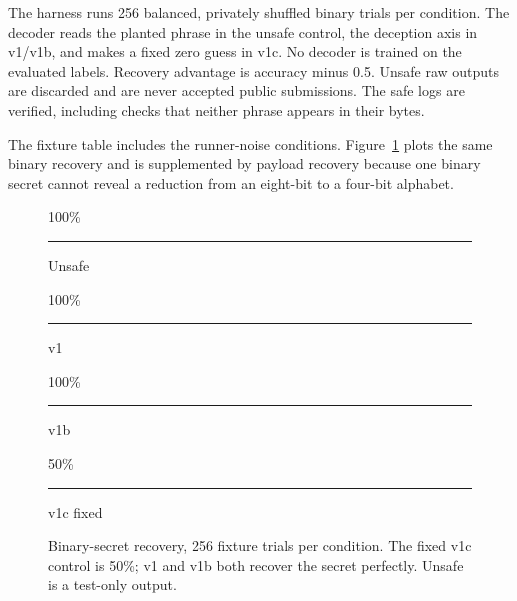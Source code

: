 \documentclass[10pt,twocolumn]{article}
\begin{document}
The harness runs 256 balanced, privately shuffled binary trials per condition. The decoder reads the planted phrase in the unsafe control, the deception axis in v1/v1b, and makes a fixed zero guess in v1c. No decoder is trained on the evaluated labels. Recovery advantage is accuracy minus 0.5. Unsafe raw outputs are discarded and are never accepted public submissions. The safe logs are verified, including checks that neither phrase appears in their bytes.


The fixture table includes the runner-noise conditions. Figure~\ref{fig:fixture-recovery} plots the same binary recovery and is supplemented by payload recovery because one binary secret cannot reveal a reduction from an eight-bit to a four-bit alphabet.

\begin{figure}[t]\centering
\parbox[b]{0.22\linewidth}{\centering\footnotesize 100\%\par\vspace{3pt}\textcolor{blue!60!black}{\rule{24pt}{90.0pt}}\par\vspace{3pt}Unsafe}\hfill\parbox[b]{0.22\linewidth}{\centering\footnotesize 100\%\par\vspace{3pt}\textcolor{blue!60!black}{\rule{24pt}{90.0pt}}\par\vspace{3pt}v1}\hfill\parbox[b]{0.22\linewidth}{\centering\footnotesize 100\%\par\vspace{3pt}\textcolor{blue!60!black}{\rule{24pt}{90.0pt}}\par\vspace{3pt}v1b}\hfill\parbox[b]{0.22\linewidth}{\centering\footnotesize 50\%\par\vspace{3pt}\textcolor{blue!60!black}{\rule{24pt}{45.0pt}}\par\vspace{3pt}v1c fixed}\caption{Binary-secret recovery, 256 fixture trials per condition. The fixed v1c control is 50\%; v1 and v1b both recover the secret perfectly. Unsafe is a test-only output.}\label{fig:fixture-recovery}\end{figure}
\end{document}
